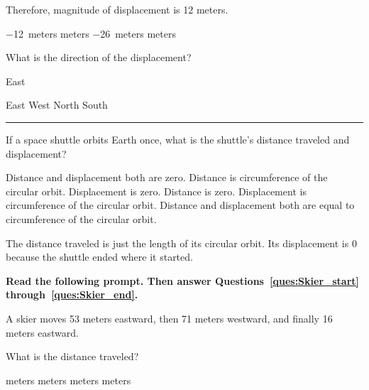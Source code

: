 \documentclass[answers]{exam}
\begin{document}
\begin{questions}
\begin{questions}
\begin{solution}
Therefore, magnitude of displacement is 12 meters.
\end{solution}

\begin{choices}
\choice \SI{-12}{meters}
 meters
\choice \SI{-26}{meters}
 meters
\end{choices}

\question \label{ques:cat_end}
What is the direction of the displacement?

\begin{solution}
East
\end{solution}

\begin{choices}
\CorrectChoice East
\choice West
\choice North
\choice South
\end{choices}

\vspace{1em} \hrule

\question
If a space shuttle orbits Earth once, what is the shuttle’s distance traveled and displacement?

\begin{choices}
\choice Distance and displacement both are zero.
\CorrectChoice Distance is circumference of the circular orbit. Displacement is zero.
\choice Distance is zero. Displacement is circumference of the circular orbit.
\choice Distance and displacement both are equal to circumference of the circular orbit.
\end{choices}

\begin{solution}
The distance traveled is just the length of its circular orbit. Its displacement is 0 because the shuttle ended where it started.
\end{solution}

\begin{EnvUplevel}
\textbf{Read the following prompt. Then answer Questions~\ref{ques:Skier_start} through~\ref{ques:Skier_end}.}

A skier moves 53 meters eastward, then 71 meters westward, and finally 16 meters eastward. 
\end{EnvUplevel}


\question \label{ques:Skier_start}
What is the distance traveled?

\begin{choices}
 meters
 meters
 meters
 meters
\end{choices}


\end{questions}
\end{questions}
\end{document}
